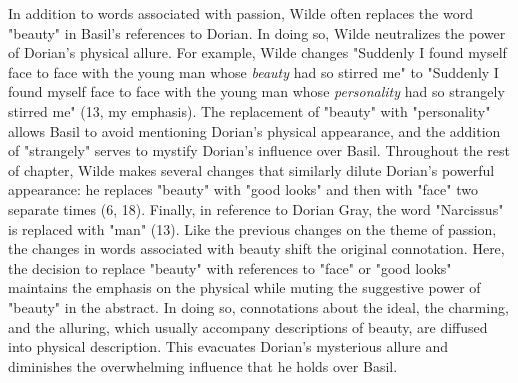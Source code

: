 \documentclass[11pt]{article}
\begin{document}
In addition to words associated with passion, Wilde often replaces the
word "beauty" in Basil's references to Dorian. In doing so, Wilde
neutralizes the power of Dorian's physical allure. For example, Wilde
changes "Suddenly I found myself face to face with the young man whose
\emph{beauty} had so stirred me" to "Suddenly I found myself face to face
with the young man whose \emph{personality} had so strangely stirred me"
(13, my emphasis). The replacement of "beauty" with "personality"
allows Basil to avoid mentioning Dorian's physical appearance, and the
addition of "strangely" serves to mystify Dorian's influence over
Basil.  Throughout the rest of chapter, Wilde makes several changes
that similarly dilute Dorian's powerful appearance: he replaces
"beauty" with "good looks" and then with "face" two separate times (6,
18). Finally, in reference to Dorian Gray, the word "Narcissus" is
replaced with "man" (13). Like the previous changes on the theme of
passion, the changes in words associated with beauty shift the
original connotation. Here, the decision to replace "beauty" with
references to "face" or "good looks" maintains the emphasis on the
physical while muting the suggestive power of "beauty" in the
abstract. In doing so, connotations about the ideal, the charming, and
the alluring, which usually accompany descriptions of beauty, are
diffused into physical description. This evacuates Dorian's mysterious
allure and diminishes the overwhelming influence that he holds over
Basil.
\end{document}
